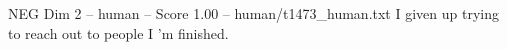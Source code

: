 \begin{textsample}{NEG Dim 2 – human – Score 1.00 – human/t1473\_human.txt}  \label{ex:f2_neg_029}
I given up trying to reach out to people I 'm finished.

\end{textsample}
